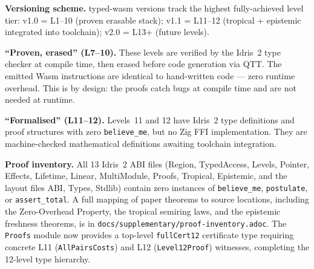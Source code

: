 \documentclass[sigplan,nonacm,screen]{acmart}
\begin{document}
\textbf{Versioning scheme.}
typed-wasm versions track the highest fully-achieved level tier:
v1.0 = L1--10 (proven erasable stack);
v1.1 = L11--12 (tropical + epistemic integrated into toolchain);
v2.0 = L13+ (future levels).

\textbf{``Proven, erased'' (L7--10).}
These levels are verified by the Idris~2 type checker at compile time,
then erased before code generation via QTT.  The emitted Wasm instructions
are identical to hand-written code --- zero runtime overhead.  This is by
design: the proofs catch bugs at compile time and are not needed at runtime.

\textbf{``Formalised'' (L11--12).}
Levels~11 and 12 have Idris~2 type definitions and proof structures with
zero \texttt{believe\_me}, but no Zig FFI implementation.  They are
machine-checked mathematical definitions awaiting toolchain integration.

\textbf{Proof inventory.}
All 13 Idris~2 ABI files (Region, TypedAccess, Levels, Pointer, Effects,
Lifetime, Linear, MultiModule, Proofs, Tropical, Epistemic, and the layout
files ABI, Types, Stdlib) contain zero instances of \texttt{believe\_me},
\texttt{postulate}, or \texttt{assert\_total}.
A full mapping of paper theorems to source locations, including the
Zero-Overhead Property, the tropical semiring laws, and the epistemic
freshness theorems, is in
\texttt{docs/supplementary/proof-inventory.adoc}.
The \texttt{Proofs} module now provides a top-level \texttt{fullCert12}
certificate type requiring concrete L11 (\texttt{AllPairsCosts}) and
L12 (\texttt{Level12Proof}) witnesses, completing the 12-level type
hierarchy.



\end{document}
